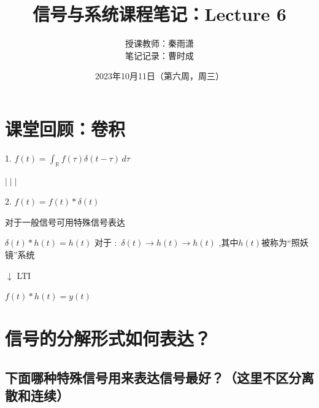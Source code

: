 \documentclass[UTF8]{ctexart}
\title{信号与系统课程笔记：Lecture 6}
\author{授课教师：秦雨潇 \\
笔记记录：曹时成}
\date{2023年10月11日（第六周，周三）}
\begin{document}
\maketitle
\section{课堂回顾：卷积}
1. $f(t)= \int _\mathbb{R} f(\tau ) \delta  (t-\tau  ) \,d\tau  $  \par
\quad $\mid \mid \mid $ \par
2. $f(t)=f(t)\ast \delta (t) $ \par
\quad 对于一般信号可用特殊信号表达 \par
\quad \quad $\delta (t) \ast h(t)=h(t)$ \; 对于 : \,$\delta (t) \rightarrow \boxed{h(t)}\rightarrow h(t)$ ,其中$\boxed{h(t)}$被称为“照妖镜”系统\par
\qquad \qquad \quad$\downarrow $ LTI \par
\quad \quad $f (t) \ast h(t)=y(t)$ \par

\section{信号的分解形式如何表达？}
\subsection{下面哪种特殊信号用来表达信号最好？（这里不区分离散和连续）}
\end{document}
